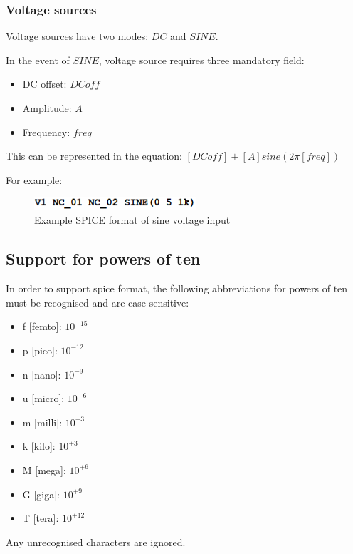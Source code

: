 \documentclass[a4paper, titlepage]{article}
\begin{document}
    \subsubsection{Voltage sources}
    Voltage sources have two modes: $DC$ and $SINE$. \par
    In the event of $SINE$, voltage source requires three mandatory field:
    \begin{itemize}
        \item DC offset: $DCoff$
        \item Amplitude: $A$
        \item Frequency: $freq$
    \end{itemize}
    This can be represented in the equation: $[DCoff]+[A]sine(2\pi [freq])$ \par
    For example:
    \begin{figure}[h]
        \centering
        \includegraphics[width=60mm,scale=1]{SINE wave example}
        \caption{Example SPICE format of sine voltage input}
        \label{fig:Netlist input example}
    \end{figure}

    \pagebreak
    \subsection{Support for powers of ten}
    In order to support {\selectfont spice} format, the following abbreviations for powers of ten 
    must be recognised and are case sensitive:
    \begin{multicols}{2}
    \begin{itemize}
        \item f [femto]: $ 10^{-15} $
        \item p [pico]: $ 10^{-12} $
        \item n [nano]: $ 10^{-9} $
        \item u [micro]: $ 10^{-6} $
        \item m [milli]: $ 10^{-3} $
        \item k [kilo]: $ 10^{+3} $
        \item M [mega]: $ 10^{+6} $
        \item G [giga]: $ 10^{+9} $
        \item T [tera]: $ 10^{+12} $
    \end{itemize}
    \end{multicols}
    Any unrecognised characters are ignored.
\end{document}
